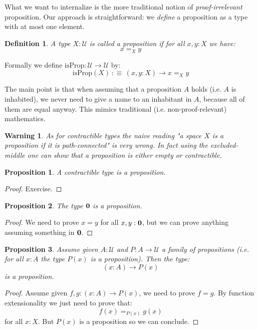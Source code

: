 \documentclass{article}
\newcommand{\U}{{\mathcal U}}
\renewcommand{\r}{\rightarrow}
\newcommand{\zero}{{\bf 0}}
\newcommand{\Prop}{\mathrm{Prop}}
\newtheorem{definition}{Definition}
\newtheorem{proposition}{Proposition}
\newtheorem{warning}{\danger Warning}
\begin{document}
What we want to internalize is the more traditional notion of \emph{proof-irrelevant} proposition. Our approach is straightforward: we \emph{define} a proposition as a type with at most one element.

\begin{definition}
A type $X:\U$ is called a proposition if for all $x,y:X$ we have: 
\[x=_X y\]

\end{definition}

Formally we define $\mathrm{isProp} : \U \r \U$ by: 
\[\mathrm{isProp}(X) \, :\equiv\,  (x,y:X)\r x=_X y\]

The main point is that when assuming that a proposition $A$ holds (i.e. $A$ is inhabited), we never need to give a name to an inhabitant in $A$, because all of them are equal anyway. This mimics traditional (i.e. non-proof-relevant) mathematics.

\begin{warning}
As for contractible types the naive reading "a space $X$ is a proposition if it is path-connected" is very wrong. In fact using the excluded-middle one can show that a proposition is either empty or contractible.
\end{warning}


\begin{proposition}
A contractible type is a proposition.
\end{proposition}
\begin{proof}
Exercise.
\end{proof}

\begin{proposition}
The type $\zero$ is a proposition.
\end{proposition}
\begin{proof}
We need to prove $x=y$ for all $x,y:\zero$, but we can prove anything assuming something in $\zero$.
\end{proof}

\begin{proposition}
Assume given $A:\U$ and $P:A\r \U$ a family of propositions (i.e. for all $x:A$ the type $P(x)$ is a proposition). Then the type: 
\[(x:A)\r P(x)\]
is a proposition.
\end{proposition}
\begin{proof}
Assume given $f,g:(x:A)\r P(x)$, we need to prove $f=g$. By function extensionality we just need to prove that:
\[f(x)=_{P(x)}g(x)\]
for all $x:X$. But $P(x)$ is a proposition so we can conclude.
\end{proof}
\end{document}
